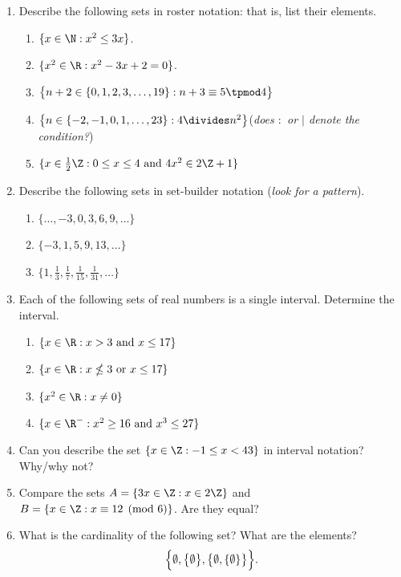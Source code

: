 \begin{enumerate}\renewcommand{\labelenumi}{\thesubsection.\theenumi}
  \item Describe the following sets in roster notation: that is, list their elements.
		\begin{enumerate}
	  	\item $\{x\in\N:x^2\le 3x\}$.
	  	\item $\{x^2\in\R:x^2-3x+2=0\}$.
	  	\item $\bigl\{n+2\in\{0,1,2,3,\ldots,19\}:n+3\equiv 5\tpmod 4\bigr\}$
	  	\item $\bigl\{n\in\{-2,-1,0,1,\ldots,23\}:4\divides n^2\bigr\}$\hfill (\emph{does $:$ or  $|$ denote the condition?})
	  	\item $\{x\in \frac 12\Z: 0\le x\le 4\text{ and }4x^2\in 2\Z+1\}$
		\end{enumerate}
		
	\item Describe the following sets in set-builder notation (\emph{look for a pattern}).
		\begin{enumerate}
	  	\item $\{\ldots,-3,0,3,6,9,\ldots\}$
	  	\item $\{-3,1,5,9,13,\ldots\}$
	  	\item $\{1,\frac 13,\frac 17,\frac 1{15},\frac 1{31},\ldots\}$
	  \end{enumerate}

  \item Each of the following sets of real numbers is a single interval. Determine the interval.
		\begin{enumerate}
	  	\item $\{x\in\R:x>3\text{ and }x\le 17\}$
	  	\item $\{x\in\R:x\nleq 3\text{ or }x\le 17\}$
	  	\item $\{x^2\in\R:x\neq 0\}$
	  	\item $\{x\in\R^-:x^2\ge 16\text{ and }x^3\le 27\}$
		\end{enumerate}
		
	\item Can you describe the set $\{x\in\Z:-1\le x<43\}$ in interval notation? Why/why not?
	
	\item Compare the sets $A=\{3x\in\Z:x\in 2\Z\}$ and $B=\{x\in\Z:x\equiv 12\pmod 6\}$. Are they equal?
		
	\item What is the cardinality of the following set? What are the elements?
	\[\Bigl\{\emptyset,\bigl\{\emptyset\bigr\},\bigl\{\emptyset,\{\emptyset\}\bigr\}\Bigr\}.\]
	

\end{enumerate}
